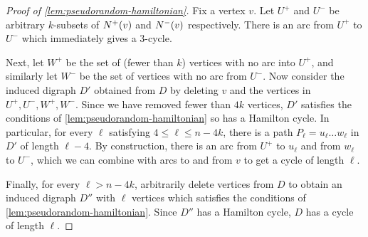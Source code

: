 \documentclass[11pt,english]{article}
\theoremstyle{plain}
\theoremstyle{definition}
\theoremstyle{definition}
\theoremstyle{plain}
\theoremstyle{plain}
\theoremstyle{plain}
\theoremstyle{plain}
\theoremstyle{remark}
\theoremstyle{remark}
\let\originalleft\left
\let\originalright\right
\renewcommand{\left}{\mathopen{}\mathclose\bgroup\originalleft}
\renewcommand{\right}{\aftergroup\egroup\originalright}
\begin{document}
\begin{proof}
[Proof of \ref{lem:pseudorandom-hamiltonian}]Fix a vertex $v$. Let
$U^{+}$ and $U^{-}$ be arbitrary $k$-subsets of $N^{+}\left(v\right)$
and $N^{-}\left(v\right)$ respectively. There is an arc from $U^{+}$
to $U^{-}$ which immediately gives a 3-cycle.

Next, let $W^{+}$ be the set of (fewer than $k$) vertices with no
arc into $U^{+}$, and similarly let $W^{-}$ be the set of vertices
with no arc from $U^{-}$. Now consider the induced digraph $D'$
obtained from $D$ by deleting $v$ and the vertices in $U^{+},U^{-},W^{+},W^{-}$.
Since we have removed fewer than $4k$ vertices, $D'$ satisfies the
conditions of \ref{lem:pseudorandom-hamiltonian} so has a Hamilton
cycle. In particular, for every $\ell$ satisfying $4\le\ell\le n-4k$,
there is a path $P_{\ell}=u_{\ell}\dots w_{\ell}$ in $D'$ of length
$\ell-4$. By construction, there is an arc from $U^{+}$ to $u_{\ell}$
and from $w_{\ell}$ to $U^{-}$, which we can combine with arcs to
and from $v$ to get a cycle of length $\ell$.

Finally, for every $\ell>n-4k$, arbitrarily delete vertices from
$D$ to obtain an induced digraph $D''$ with $\ell$ vertices which
satisfies the conditions of \ref{lem:pseudorandom-hamiltonian}. Since
$D''$ has a Hamilton cycle, $D$ has a cycle of length $\ell$.
\end{proof}
\end{document}
